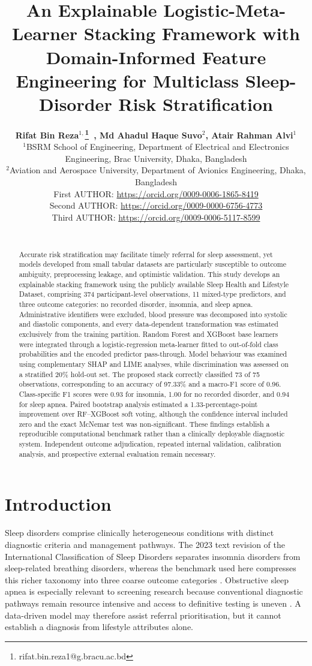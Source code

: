 \documentclass{elektr}
\title{An Explainable Logistic-Meta-Learner Stacking Framework with Domain-Informed Feature Engineering for Multiclass Sleep-Disorder Risk Stratification}
\author[AUTHOR and AUTHOR]{
	\textbf{Rifat Bin Reza$^{1,}$\thanks{rifat.bin.reza1@g.bracu.ac.bd}~, Md Ahadul Haque Suvo$^{2}$, Atair Rahman Alvi$^{1}$}\\
	$^{1}$BSRM School of Engineering, Department of Electrical and Electronics Engineering, Brac University, Dhaka, Bangladesh\\ 	
	$^{2}$Aviation and Aerospace University, Department of Avionics Engineering, Dhaka, Bangladesh\\
  First AUTHOR: \url{https://orcid.org/0009-0006-1865-8419} \\
  Second AUTHOR: \url{https://orcid.org/0009-0000-6756-4773} \\
  Third AUTHOR: \url{https://orcid.org/0009-0006-5117-8599} \\
  \\ 
\rec{...}
\acc{...}
\finv{...}
}
\begin{document}
\raggedbottom

\maketitle

\begin{abstract}Accurate risk stratification may facilitate timely referral for sleep assessment, yet models developed from small tabular datasets are particularly susceptible to outcome ambiguity, preprocessing leakage, and optimistic validation. This study develops an explainable stacking framework using the publicly available Sleep Health and Lifestyle Dataset, comprising 374 participant-level observations, 11 mixed-type predictors, and three outcome categories: no recorded disorder, insomnia, and sleep apnea. Administrative identifiers were excluded, blood pressure was decomposed into systolic and diastolic components, and every data-dependent transformation was estimated exclusively from the training partition. Random Forest and XGBoost base learners were integrated through a logistic-regression meta-learner fitted to out-of-fold class probabilities and the encoded predictor pass-through. Model behaviour was examined using complementary SHAP and LIME analyses, while discrimination was assessed on a stratified 20\% hold-out set. The proposed stack correctly classified 73 of 75 observations, corresponding to an accuracy of 97.33\% and a macro-F1 score of 0.96. Class-specific F1 scores were 0.93 for insomnia, 1.00 for no recorded disorder, and 0.94 for sleep apnea. Paired bootstrap analysis estimated a 1.33-percentage-point improvement over RF--XGBoost soft voting, although the confidence interval included zero and the exact McNemar test was non-significant. These findings establish a reproducible computational benchmark rather than a clinically deployable diagnostic system. Independent outcome adjudication, repeated internal validation, calibration analysis, and prospective external evaluation remain necessary.

\end{abstract}

\section{Introduction}
Sleep disorders comprise clinically heterogeneous conditions with distinct diagnostic criteria and management pathways. The 2023 text revision of the International Classification of Sleep Disorders separates insomnia disorders from sleep-related breathing disorders, whereas the benchmark used here compresses this richer taxonomy into three coarse outcome categories \cite{aasm2023}. Obstructive sleep apnea is especially relevant to screening research because conventional diagnostic pathways remain resource intensive and access to definitive testing is uneven \cite{korkalainen2024,giorgi2025,bazoukis2023}. A data-driven model may therefore assist referral prioritisation, but it cannot establish a diagnosis from lifestyle attributes alone.
\end{document}

